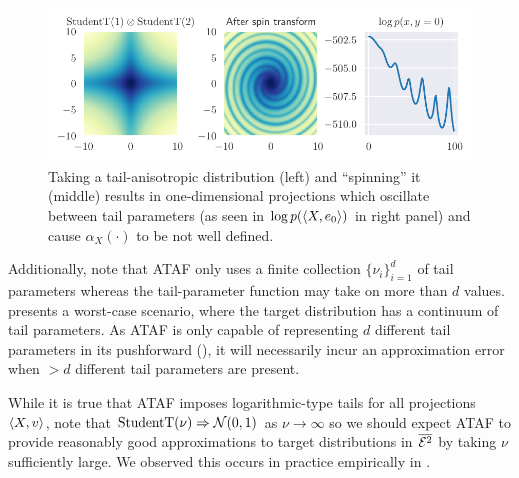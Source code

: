 \documentclass{article}
\theoremstyle{definition}
\theoremstyle{remark}
\begin{document}
\begin{figure}[htbp]
    \centering
    \includegraphics{Figures/spiral.pdf}
    \caption{Taking a tail-anisotropic distribution (left) and ``spinning'' it (middle) results in
        one-dimensional projections which oscillate between tail parameters (as seen in
        $\log p(\braket{X,e_0})$ in right panel) and cause $\alpha_X(\cdot)$ to be not well defined.
    }
    \label{fig:spiral}
\end{figure}

Additionally, note that ATAF only uses a finite collection $\{\nu_i\}_{i=1}^d$ of tail parameters
whereas the tail-parameter function may take on more than $d$ values. 
presents a worst-case scenario, where the target distribution has a continuum of tail parameters.
As ATAF is only capable of representing $d$ different tail parameters in its pushforward
(), it will necessarily incur an approximation error when $> d$ different
tail parameters are present.

While it is true that ATAF imposes logarithmic-type tails for all projections $\braket{X,v}$,
note that $\text{StudentT}(\nu) \Rightarrow \mathcal{N}(0,1)$ as $\nu \to \infty$ so we should expect
ATAF to provide reasonably good approximations to target distributions in $\overline{\mathcal{E}^2}$
by taking $\nu$ sufficiently large. We observed this occurs in practice empirically
in .

\end{document}
